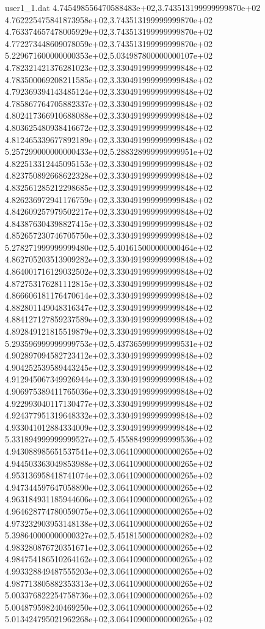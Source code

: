 \begin{filecontents}{user1_1.dat}
4.745498556470588483e+02,3.743513199999999870e+02
4.762225475841873958e+02,3.743513199999999870e+02
4.763374657478005929e+02,3.743513199999999870e+02
4.772273448609078059e+02,3.743513199999999870e+02
5.229671600000000353e+02,5.034987800000000107e+02
4.782321421376281023e+02,3.330491999999999848e+02
4.783500069208211585e+02,3.330491999999999848e+02
4.792369394143485124e+02,3.330491999999999848e+02
4.785867764705882337e+02,3.330491999999999848e+02
4.802417366910688088e+02,3.330491999999999848e+02
4.803625480938416672e+02,3.330491999999999848e+02
4.812465339677892189e+02,3.330491999999999848e+02
5.257299000000000433e+02,5.288328999999999951e+02
4.822513312445095153e+02,3.330491999999999848e+02
4.823750892668622328e+02,3.330491999999999848e+02
4.832561285212298685e+02,3.330491999999999848e+02
4.826236972941176759e+02,3.330491999999999848e+02
4.842609257979502217e+02,3.330491999999999848e+02
4.843876304398827415e+02,3.330491999999999848e+02
4.852657230746705750e+02,3.330491999999999848e+02
5.278271999999999480e+02,5.401615000000000464e+02
4.862705203513909282e+02,3.330491999999999848e+02
4.864001716129032502e+02,3.330491999999999848e+02
4.872753176281112815e+02,3.330491999999999848e+02
4.866606181176470614e+02,3.330491999999999848e+02
4.882801149048316347e+02,3.330491999999999848e+02
4.884127127859237589e+02,3.330491999999999848e+02
4.892849121815519879e+02,3.330491999999999848e+02
5.293596999999999753e+02,5.437365999999999531e+02
4.902897094582723412e+02,3.330491999999999848e+02
4.904252539589443245e+02,3.330491999999999848e+02
4.912945067349926944e+02,3.330491999999999848e+02
4.906975389411765036e+02,3.330491999999999848e+02
4.922993040117130477e+02,3.330491999999999848e+02
4.924377951319648332e+02,3.330491999999999848e+02
4.933041012884334009e+02,3.330491999999999848e+02
5.331894999999999527e+02,5.455884999999999536e+02
4.943088985651537541e+02,3.064109000000000265e+02
4.944503363049853988e+02,3.064109000000000265e+02
4.953136958418741074e+02,3.064109000000000265e+02
4.947344597647058890e+02,3.064109000000000265e+02
4.963184931185944606e+02,3.064109000000000265e+02
4.964628774780059075e+02,3.064109000000000265e+02
4.973232903953148138e+02,3.064109000000000265e+02
5.398640000000000327e+02,5.451815000000000282e+02
4.983280876720351671e+02,3.064109000000000265e+02
4.984754186510264162e+02,3.064109000000000265e+02
4.993328849487555203e+02,3.064109000000000265e+02
4.987713805882353313e+02,3.064109000000000265e+02
5.003376822254758736e+02,3.064109000000000265e+02
5.004879598240469250e+02,3.064109000000000265e+02
5.013424795021962268e+02,3.064109000000000265e+02

\end{filecontents}
